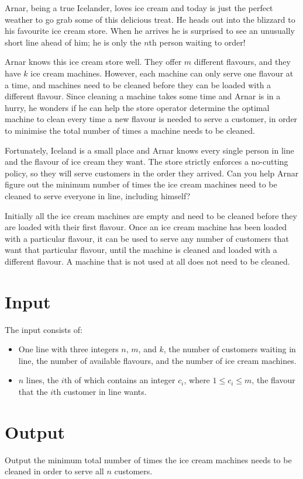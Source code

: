 Arnar, being a true Icelander, loves ice cream and today is just the perfect
weather to go grab some of this delicious treat. He heads out into the blizzard
to his favourite ice cream store. When he arrives he is surprised to see an
unusually short line ahead of him; he is only the $n$th person waiting to order!

Arnar knows this ice cream store well. They offer $m$ different flavours, and
they have $k$ ice cream machines. However, each machine can only serve one
flavour at a time, and machines need to be cleaned before they can be loaded
with a different flavour. Since cleaning a machine takes some time and Arnar is
in a hurry, he wonders if he can help the store operator determine the optimal
machine to clean every time a new flavour is needed to serve a customer, in
order to minimise the total number of times a machine needs to be cleaned.

Fortunately, Iceland is a small place and Arnar knows every single person in
line and the flavour of ice cream they want. The store strictly enforces a
no-cutting policy, so they will serve customers in the order they arrived. Can
you help Arnar figure out the minimum number of times the ice cream machines
need to be cleaned to serve everyone in line, including himself?

Initially all the ice cream machines are empty and need to be cleaned before
they are loaded with their first flavour. Once an ice cream machine has been
loaded with a particular flavour, it can be used to serve any number of
customers that want that particular flavour, until the machine is cleaned and
loaded with a different flavour. A machine that is not used at all does not
need to be cleaned.

\section*{Input}
The input consists of:
\begin{itemize}
  \item One line with three integers $n$, $m$, and $k$, the number of
    customers waiting in line, the number of available flavours, and the
    number of ice cream machines.
  \item $n$ lines, the $i$th of which contains an integer $c_i$, where $1 \leq c_i
    \leq m$, the flavour that the $i$th customer in line wants.
\end{itemize}

\section*{Output}
Output the minimum total number of times the ice cream machines needs to be
cleaned in order to serve all $n$ customers.

